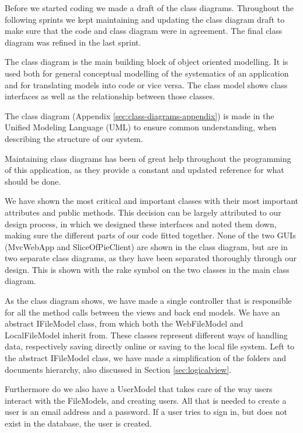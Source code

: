 Before we started coding we made a draft of the class diagrams. Throughout the following sprints we kept maintaining and updating the class diagram
draft to make sure that the code and class diagram were in agreement. The final class diagram was refined in the last sprint.

The class diagram is the main building block of object oriented modelling. It is used both for general conceptual modelling of the systematics 
of an application and for translating models into code or vice versa. The class model
shows class interfaces as well as the relationship between those classes.

The class diagram (Appendix \ref{sec:class-diagrams-appendix}) is made in the Unified Modeling Language (UML) to ensure common understanding, when describing the structure of our system.

Maintaining class diagrams has been of great help throughout the programming of this application, as they provide a constant and updated reference
for what should be done.

We have shown the most critical and important classes with their most important attributes and public methods. This decision can be largely attributed
to our design process, in which we designed these interfaces and noted them down, making sure the different parts of our code fitted together.
None of the two GUIs (MvcWebApp and SliceOfPieClient) are shown in the class diagram, but are in two separate class diagrams, as they have been separated
thoroughly through our design. This is shown with the rake symbol on the two classes in the main class diagram.

As the class diagram shows, we have made a single controller that is responsible for all the method calls between the views and back end models. We
have an abstract IFileModel class, from which both the WebFileModel and LocalFileModel inherit from. These classes represent different ways of handling
data, respectively saving directly online or saving to the local file system. Left to the abstract IFileModel class, we have
made a simplification of the folders and documents hierarchy, also discussed in Section \ref{sec:logicalview}.

Furthermore do we also have a UserModel that takes care of the way users interact with the FileModels, and creating users. All that is needed
to create a user is an email address and a password. If a user tries to sign in, but does not exist in the database, the user is created.

